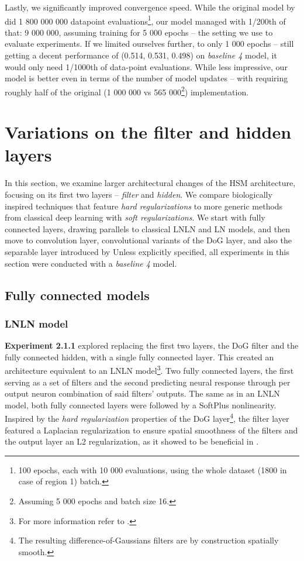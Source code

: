 Lastly, we significantly improved convergence speed. While the original model by \citeauthor{antolik} did 1 800 000 000 datapoint evaluations\footnote{100 epochs, each with 10 000 evaluations, using the whole dataset (1800 in case of region 1) batch.}, our model managed with 1/200th of that: 9 000 000, assuming training for 5 000 epochs -- the setting we use to evaluate experiments. If we limited ourselves further, to only 1 000 epochs -- still getting a decent performance of (0.514, 0.531, 0.498) on \textit{baseline 4} model, it would only need 1/1000th of data-point evaluations. While less impressive, our model is better even in terms of the number of model updates -- with requiring roughly half of the original (1 000 000 vs 565 000\footnote{Assuming 5 000 epochs and batch size 16.}) implementation.

\section{Variations on the filter and hidden layers}
In this section, we examine larger architectural changes of the {HSM architecture}, focusing on its first two layers -- \textit{filter} and \textit{hidden}. We compare biologically inspired techniques that feature \textit{hard regularizations} to more generic methods from classical deep learning with \textit{soft regularizations}. We start with fully connected layers, drawing parallels to classical LNLN and LN models, and then move to convolution layer, convolutional variants of the DoG layer, and also the separable layer introduced by \cite{klindt} Unless explicitly specified, all experiments in this section were conducted with a \textit{baseline 4} model.

\subsection{Fully connected models}
\subsubsection{LNLN model}\label{ex:2.1.1}

\textbf{Experiment 2.1.1} explored replacing the first two layers, the DoG filter and the fully connected hidden, with a single fully connected layer. This created an architecture equivalent to an LNLN model\footnote{For more information refer to .}. Two fully connected layers, the first serving as a set of filters and the second predicting neural response through per output neuron combination of said filters’ outputs. The same as in an LNLN model, both fully connected layers were followed by a SoftPlus nonlinearity. Inspired by the \textit{hard regularization} properties of the DoG layer\footnote{The resulting difference-of-Gaussians filters are by construction spatially smooth.}, the filter layer featured a Laplacian regularization to ensure spatial smoothness of the filters and the output layer an L2 regularization, as it showed to be beneficial in .

